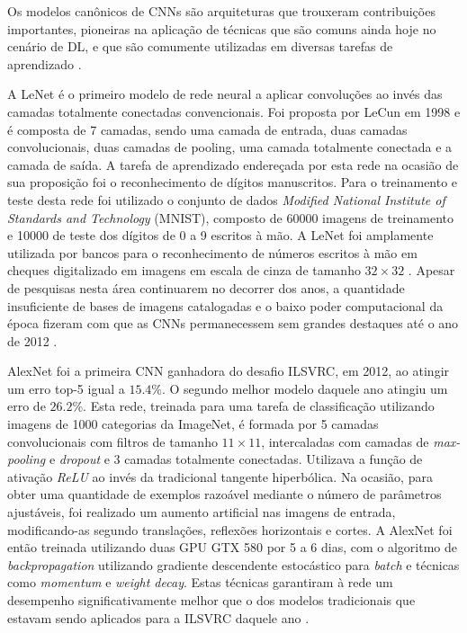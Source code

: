 
Os modelos canônicos de CNNs são arquiteturas que trouxeram contribuições importantes, pioneiras na aplicação de técnicas que são comuns ainda hoje no cenário de DL, e que são comumente utilizadas em diversas tarefas de aprendizado \cite{9dlpapers}.

A LeNet é o primeiro modelo de rede neural a aplicar convoluções ao invés das camadas totalmente conectadas convencionais. Foi proposta por LeCun em 1998 e é composta de 7 camadas, sendo uma camada de entrada, duas camadas convolucionais, duas camadas de pooling, uma camada totalmente conectada e a camada de saída. A tarefa de aprendizado endereçada por esta rede na ocasião de sua proposição foi o reconhecimento de dígitos manuscritos. Para o treinamento e teste desta rede foi utilizado o conjunto de dados \emph{Modified National Institute of Standards and Technology} (MNIST), composto de 60000 imagens de treinamento e 10000 de teste dos dígitos de 0 a 9 escritos à mão. A LeNet foi amplamente utilizada por bancos para o reconhecimento de números escritos à mão em cheques digitalizado em imagens em escala de cinza de tamanho $32 \times 32$ \cite{lenet}. Apesar de pesquisas nesta área continuarem no decorrer dos anos, a quantidade insuficiente de bases de imagens catalogadas e o baixo poder computacional da época fizeram com que as CNNs permanecessem sem grandes destaques até o ano de 2012 \cite{dl9papers}.

AlexNet foi a primeira CNN ganhadora do desafio ILSVRC, em 2012, ao atingir um erro top-5 igual a $15.4\%$. O segundo melhor modelo daquele ano atingiu um erro de $26.2\%$. Esta rede, treinada para uma tarefa de classificação utilizando imagens de 1000 categorias da ImageNet, é formada por 5 camadas convolucionais com filtros de tamanho $11 \times 11$, intercaladas com camadas de \emph{max-pooling} e \emph{dropout} e $3$ camadas totalmente conectadas. Utilizava a função de ativação \emph{ReLU} ao invés da tradicional tangente hiperbólica. Na ocasião, para obter uma quantidade de exemplos razoável mediante o número de parâmetros ajustáveis, foi realizado um aumento artificial nas imagens de entrada, modificando-as segundo translações, reflexões horizontais e cortes. A AlexNet foi então treinada utilizando duas GPU GTX 580 por 5 a 6 dias, com o algoritmo de \emph{backpropagation} utilizando gradiente descendente estocástico para \emph{batch} e técnicas como \emph{momentum} e \emph{weight decay}. Estas técnicas garantiram à rede um desempenho significativamente melhor que o dos modelos tradicionais que estavam sendo aplicados para a ILSVRC daquele ano \cite{alexnet}.

